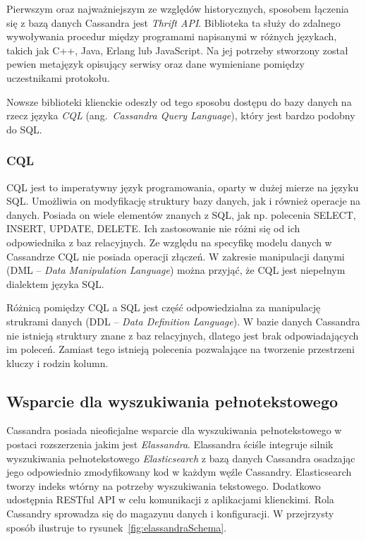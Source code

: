 Pierwszym oraz najważniejszym ze względów historycznych, sposobem łączenia się z bazą danych Cassandra jest \textit{Thrift API}.
Biblioteka ta służy do zdalnego wywoływania procedur między programami napisanymi w różnych językach, takich jak C++, Java, Erlang lub JavaScript.
Na jej potrzeby stworzony został pewien metajęzyk opisujący serwisy oraz dane wymieniane pomiędzy uczestnikami protokołu.

Nowsze biblioteki klienckie odeszły od tego sposobu dostępu do bazy danych na rzecz języka \textit{CQL} (ang.~\textit{Cassandra Query Language}), który jest bardzo podobny do SQL.

\subsubsection{CQL}

CQL jest to imperatywny język programowania, oparty w dużej mierze na języku SQL.
Umożliwia on modyfikację struktury bazy danych, jak i również operacje na danych.
Posiada on wiele elementów znanych z SQL, jak np. polecenia SELECT, INSERT, UPDATE, DELETE.
Ich zastosowanie nie różni się od ich odpowiednika z baz relacyjnych. 
Ze względu na specyfikę modelu danych w Cassandrze CQL nie posiada operacji złączeń.
W zakresie manipulacji danymi (DML -- \textit{Data Manipulation Language}) można przyjąć, że CQL jest niepełnym dialektem języka SQL.

Różnicą pomiędzy CQL a SQL jest część odpowiedzialna za manipulację strukrami danych (DDL -- \textit{Data Definition Language}).
W bazie danych Cassandra nie istnieją struktury znane z baz relacyjnych, dlatego jest brak odpowiadających im poleceń.
Zamiast tego istnieją polecenia pozwalające na tworzenie przestrzeni kluczy i rodzin kolumn.

\subsection{Wsparcie dla wyszukiwania pełnotekstowego}

Cassandra posiada nieoficjalne wsparcie dla wyszukiwania pełnotekstowego w postaci rozszerzenia jakim jest \textit{Elassandra}.
Elassandra ściśle integruje silnik wyszukiwania pełnotekstowego \textit{Elasticsearch} z bazą danych Cassandra osadzając jego odpowiednio zmodyfikowany kod w każdym węźle Cassandry.
Elasticsearch tworzy indeks wtórny na potrzeby wyszukiwania tekstowego.
Dodatkowo udostępnia RESTful API w celu komunikacji z aplikacjami klienckimi. 
Rola Cassandry sprowadza się do magazynu danych i konfiguracji.
W przejrzysty sposób ilustruje to rysunek~\ref{fig:elassandraSchema}.

